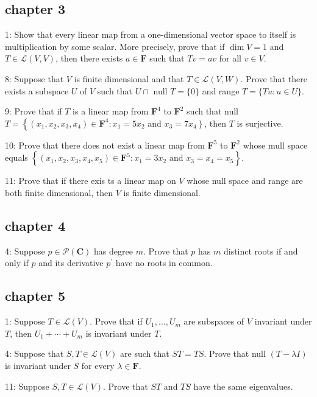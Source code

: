 \documentclass{article}
\begin{document}
\subsection*{chapter 3}
1: Show that every linear map from a one-dimensional vector space to itself is multiplication by some scalar. More precisely, prove that if $\operatorname{dim} V=1$ and $T \in \mathcal{L}(V, V)$, then there exists $a \in \mathbf{F}$ such that $T v=a v$ for all $v \in V$.

8: Suppose that $V$ is finite dimensional and that $T \in \mathcal{L}(V, W)$. Prove that there exists a subspace $U$ of $V$ such that $U \cap$ null $T=\{0\}$ and range $T=\{T u: u \in U\}$.

9: Prove that if $T$ is a linear map from $\mathbf{F}^{4}$ to $\mathbf{F}^{2}$ such that null $T=\left\{\left(x_{1}, x_{2}, x_{3}, x_{4}\right) \in \mathbf{F}^{4}: x_{1}=5 x_{2}\right.$ and $\left.x_{3}=7 x_{4}\right\}$, then $T$ is surjective.

10: Prove that there does not exist a linear map from $\mathbf{F}^{5}$ to $\mathbf{F}^{2}$ whose mull space equals $\left\{\left(x_{1}, x_{2}, x_{3}, x_{4}, x_{5}\right) \in \mathbf{F}^{5}: x_{1}=3 x_{2} \text { and } x_{3}=x_{4}=x_{5}\right\} .$

11: Prove that if there exis ts a linear map on $V$ whose null space and range are both finite dimensional, then $V$ is finite dimensional.

\subsection*{chapter 4}
4: Suppose $p \in \mathcal{P}(\mathbf{C})$ has degree $m$. Prove that $p$ has $m$ distinct roots if and only if $p$ and its derivative $p^{\prime}$ have no roots in common.

\subsection*{chapter 5}
1: Suppose $T \in \mathcal{L}(V)$. Prove that if $U_{1}, \ldots, U_{m}$ are subspaces of $V$ invariant under $T$, then $U_{1}+\cdots+U_{m}$ is invariant under $T$.

4: Suppose that $S, T \in \mathcal{L}(V)$ are such that $S T=T S$. Prove that null $(T-\lambda I)$ is invariant under $S$ for every $\lambda \in \mathbf{F}$.

11: Suppose $S, T \in \mathcal{L}(V)$. Prove that $S T$ and $T S$ have the same eigenvalues.
\end{document}
